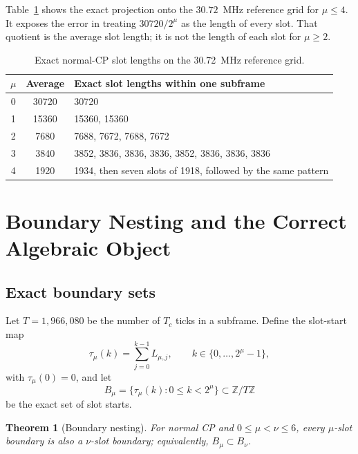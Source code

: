 \documentclass[11pt]{article}
\newtheorem{theorem}{Theorem}
\begin{document}
Table~\ref{tab:slot-ts} shows the exact projection onto the $30.72$~MHz reference grid for $\mu\leq4$.  It exposes the error in treating $30720/2^\mu$ as the length of every slot.  That quotient is the average slot length; it is not the length of each slot for $\mu\geq2$.

\begin{table}[ht]
\centering
\caption{Exact normal-CP slot lengths on the 30.72~MHz reference grid.}
\label{tab:slot-ts}
\small
\begin{tabular}{c c p{8.4cm}}
\toprule
$\mu$ & Average & Exact slot lengths within one subframe \\
\midrule
0 & 30720 & 30720 \\
1 & 15360 & 15360, 15360 \\
2 & 7680 & 7688, 7672, 7688, 7672 \\
3 & 3840 & 3852, 3836, 3836, 3836, 3852, 3836, 3836, 3836 \\
4 & 1920 & 1934, then seven slots of 1918, followed by the same pattern \\
\bottomrule
\end{tabular}
\end{table}

\section{Boundary Nesting and the Correct Algebraic Object}

\subsection{Exact boundary sets}

Let $T=1{,}966{,}080$ be the number of $T_c$ ticks in a subframe.  Define the slot-start map
\begin{equation}
    \tau_\mu(k)=\sum_{j=0}^{k-1}L_{\mu,j},
    \qquad k\in\{0,\ldots,2^\mu-1\},
    \label{eq:tau}
\end{equation}
with $\tau_\mu(0)=0$, and let
\begin{equation}
    B_\mu=\{\tau_\mu(k):0\leq k<2^\mu\}\subset\mathbb{Z}/T\mathbb{Z}
    \label{eq:bset}
\end{equation}
be the exact set of slot starts.

\begin{theorem}[Boundary nesting]
For normal CP and $0\leq\mu<\nu\leq6$, every $\mu$-slot boundary is also a $\nu$-slot boundary; equivalently, $B_\mu\subset B_\nu$.
\end{theorem}
\end{document}

